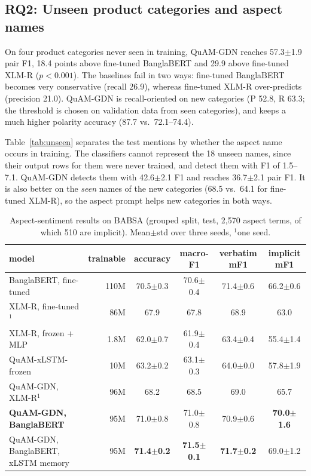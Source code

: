 \documentclass[11pt]{article}
\newcommand{\pmstd}[2]{#1{\scriptsize$\pm$#2}}
\newcommand{\quam}{QuAM-GDN}
\begin{document}
\subsection{RQ2: Unseen product categories and aspect names}
On four product categories never seen in training, \quam{} reaches \pmstd{57.3}{1.9} pair F1, 18.4
points above fine-tuned BanglaBERT and 29.9 above fine-tuned XLM-R ($p<0.001$). The baselines fail in
two ways: fine-tuned BanglaBERT becomes very conservative (recall 26.9), whereas fine-tuned XLM-R
over-predicts (precision 21.0). \quam{} is recall-oriented on new categories (P 52.8, R 63.3; the
threshold is chosen on validation data from seen categories), and keeps a much higher polarity
accuracy (87.7 vs.\ 72.1--74.4).

Table~\ref{tab:unseen} separates the test mentions by whether the aspect name occurs in training. The
classifiers cannot represent the 18 unseen names, since their output rows for them were never trained,
and detect them with F1 of 1.5--7.1. \quam{} detects them with \pmstd{42.6}{2.1} F1 and reaches
\pmstd{36.7}{2.1} pair F1. It is also better on the \emph{seen} names of the new categories (68.5 vs.\
64.1 for fine-tuned XLM-R), so the aspect prompt helps new categories in both ways.

\begin{table}[t]
\centering\small
\begin{tabular}{lrcccc}
\toprule
model & trainable & accuracy & macro-F1 & verbatim mF1 & implicit mF1 \\
\midrule
BanglaBERT, fine-tuned & 110M & \pmstd{70.5}{0.3} & \pmstd{70.6}{0.4} & \pmstd{71.4}{0.6} & \pmstd{66.2}{0.6} \\
XLM-R, fine-tuned$^1$ & 86M & 67.9 & 67.8 & 68.9 & 63.0 \\
XLM-R, frozen + MLP & 1.8M & \pmstd{62.0}{0.7} & \pmstd{61.9}{0.4} & \pmstd{63.4}{0.4} & \pmstd{55.4}{1.4} \\
QuAM-xLSTM-frozen & 10M & \pmstd{63.2}{0.2} & \pmstd{63.1}{0.3} & \pmstd{64.0}{0.0} & \pmstd{57.8}{1.9} \\
\midrule
\quam{}, XLM-R$^1$ & 96M & 68.2 & 68.5 & 69.0 & 65.7 \\
\textbf{\quam{}, BanglaBERT} & 95M & \pmstd{71.0}{0.8} & \pmstd{71.0}{0.8} & \pmstd{70.9}{0.6} & \textbf{\pmstd{70.0}{1.6}} \\
\quam{}, BanglaBERT, xLSTM memory & 95M & \textbf{\pmstd{71.4}{0.2}} & \textbf{\pmstd{71.5}{0.1}} & \textbf{\pmstd{71.7}{0.2}} & \pmstd{69.0}{1.2} \\
\bottomrule
\end{tabular}
\caption{Aspect-sentiment results on BABSA (grouped split, test, 2,570 aspect terms, of which 510 are
implicit). Mean$\pm$std over three seeds, $^1$one seed.}
\label{tab:babsa}
\end{table}
\end{document}
